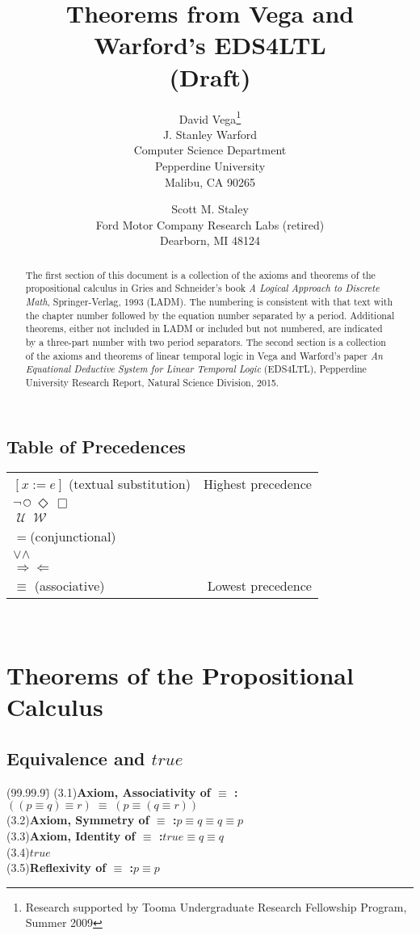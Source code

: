 \documentclass[12pt, fleqn, leqno]{article}
\title{Theorems from Vega and Warford's EDS4LTL\\(Draft)}
\author{David Vega\thanks{Research supported by Tooma Undergraduate Research Fellowship Program, Summer 2009}\\
   J. Stanley Warford\\
   Computer Science Department\\
   Pepperdine University\\
   Malibu, CA 90265
   \and
   Scott M. Staley\\
   Ford Motor Company Research Labs (retired)\\
   Dearborn, MI 48124}
\date{} %
\newcommand{\lgap}{2pt}                             %
\newcommand{\llgap}{6pt}                            %
\newcommand{\equivs}{\ensuremath{\;\equiv\;}}       %
\newcommand{\impl}{\ensuremath{\Rightarrow}}        %
\newcommand{\foll}{\ensuremath{\Leftarrow}}         %
\newcommand{\Until}{\;\mathcal{U}\;}
\newcommand{\Wait}{\;\mathcal{W}\;}
\newcommand{\Next}{\;\,\text{\raisebox{3.5pt}{\circle{6}}}}
\newcommand{\Event}{\Diamond\,}
\newcommand{\Always}{\Box\,}
\begin{document}
\maketitle

\begin{abstract}
The first section of this document is a collection of the axioms and theorems of the
propositional calculus in Gries and Schneider's
book \textit{A Logical Approach to Discrete Math}, Springer-Verlag, 1993 (LADM).
The numbering is consistent with that text with the chapter number followed by the equation number separated by a period.
Additional theorems, either not included in LADM or included but not numbered, are indicated by a three-part number with two period separators.
The second section is a collection of the axioms and theorems of linear temporal logic
in Vega and Warford's paper \textit{An Equational Deductive System for Linear Temporal Logic}
(EDS4LTL),
Pepperdine University Research Report, Natural Science Division, 2015.
\end{abstract}

\subsection*{Table of Precedences}

\begin{tabular}{lr}
\hline
$[x := e]$ (textual substitution) & Highest precedence\\
$\neg$\quad $\Next$\quad $\Event$\quad $\Always$ &\\
$\Until$\quad $\Wait$ &\\
$=$\quad (conjunctional) &\\
$\lor$\quad $\land$ &\\
$\impl$\quad $\foll$ &\\
$\equiv$ \quad (associative) & Lowest precedence\\
\hline
\end{tabular}\\[\llgap]

\section*{Theorems of the Propositional Calculus}

\subsection*{Equivalence and $true$}
\begin{tabbing}
(99.99.9)\;\=\kill
(3.1)\>\textbf{Axiom, Associativity of $\equiv$ :}\quad $((p\equiv q) \equiv r)\equivs (p\equiv (q\equiv r))$\\[\lgap]
(3.2)\>\textbf{Axiom, Symmetry of $\equiv$ :}\quad $p\equiv q \equiv q\equiv p$\\[\lgap]
(3.3)\>\textbf{Axiom, Identity of $\equiv$ :}\quad $true\equiv q \equiv q$\\[\lgap]
(3.4)\>$true$\\[\lgap]
(3.5)\>\textbf{Reflexivity of $\equiv$ :}\quad $p\equiv p$\\
\end{tabbing}
\end{document}
